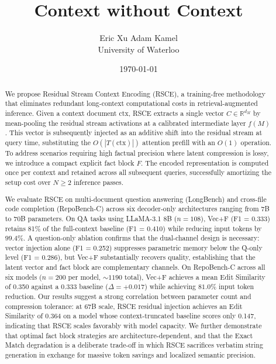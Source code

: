 \documentclass[11pt]{article}
\title{Context without Context}
\author{Eric Xu \quad Adam Kamel \\
\small{University of Waterloo}}
\date{\today}
\newcommand{\ctx}{\mathrm{ctx}}
\begin{document}
\maketitle

\begin{abstract}
We propose Residual Stream Context Encoding (RSCE), a training-free methodology that eliminates redundant long-context computational costs in retrieval-augmented inference. Given a context document $\ctx$, RSCE extracts a single vector $C \in \mathbb{R}^{d_M}$ by mean-pooling the residual stream activations at a calibrated intermediate layer $f(M)$. This vector is subsequently injected as an additive shift into the residual stream at query time, substituting the $O(|T(\ctx)|)$ attention prefill with an $O(1)$ operation. To address scenarios requiring high factual precision where latent compression is lossy, we introduce a compact explicit fact block $F$. The encoded representation is computed once per context and retained across all subsequent queries, successfully amortizing the setup cost over $N \geq 2$ inference passes.

We evaluate RSCE on multi-document question answering (LongBench) and cross-file code completion (RepoBench-C) across six decoder-only architectures ranging from 7B to 70B parameters. On QA tasks using LLaMA-3.1 8B ($n = 108$), Vec+F (F1 = 0.333) retains 81\% of the full-context baseline (F1 = 0.410) while reducing input tokens by $\mathbf{99.4\%}$. A question-only ablation confirms that the dual-channel design is necessary: vector injection alone (F1 = 0.252) suppresses parametric memory below the Q-only level (F1 = 0.286), but Vec+F substantially recovers quality, establishing that the latent vector and fact block are complementary channels. On RepoBench-C across all six models ($n = 200$ per model, ${\sim}1190$ total), Vec+F achieves a mean Edit Similarity of 0.350 against a 0.333 baseline ($\Delta = +0.017$) while achieving $\mathbf{81.0\%}$ input token reduction. Our results suggest a strong correlation between parameter count and compression tolerance: at 67B scale, RSCE residual injection achieves an Edit Similarity of 0.364 on a model whose context-truncated baseline scores only 0.147, indicating that RSCE scales favorably with model capacity. We further demonstrate that optimal fact block strategies are architecture-dependent, and that the Exact Match degradation is a deliberate trade-off in which RSCE sacrifices verbatim string generation in exchange for massive token savings and localized semantic precision.
\end{abstract}
\end{document}
